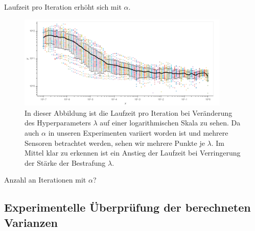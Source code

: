 Laufzeit pro Iteration erhöht sich mit $\alpha$.
\begin{figure}
\centering
\includegraphics[width = 0.9\textwidth]{figures/run_time_per_iteration.png}
\caption{In dieser Abbildung ist die Laufzeit pro Iteration bei Veränderung des Hyperparameters $\lambda$ auf einer logarithmischen Skala zu sehen. Da auch $\alpha$ in unseren Experimenten variiert worden ist und mehrere Sensoren betrachtet werden, sehen wir mehrere Punkte je $\lambda$. Im Mittel klar zu erkennen ist ein Anstieg der Laufzeit bei Verringerung der Stärke der Bestrafung $\lambda$.}
\label{run_time_per_iteration}
\end{figure}

Anzahl an Iterationen mit $\alpha$?




\subsection{Experimentelle Überprüfung der berechneten Varianzen}

